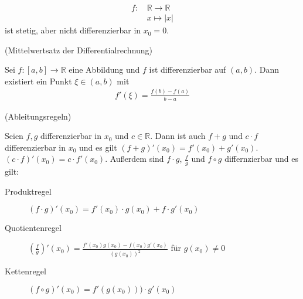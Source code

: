 \begin{align*}
    f : &\,\mathbb{R} \rightarrow \mathbb{R} \\
    &\,x \mapsto |x|
\end{align*}
ist stetig, aber nicht differenzierbar in $x_0 = 0$.

\begin{center}
\end{center}

 (Mittelwertsatz der Differentialrechnung)

Sei $f : [a, b] \rightarrow \mathbb{R}$ eine Abbildung und $f$ ist differenzierbar auf $(a, b)$. Dann existiert ein Punkt $\xi \in (a, b)$ mit
\begin{align*}
    f'(\xi) = \frac{f(b)-f(a)}{b-a}
\end{align*}


 (Ableitungsregeln)

Seien $f, g$ differenzierbar in $x_0$ und $c \in \mathbb{R}$. Dann ist auch $f+g$ und $c\cdot f$ differenzierbar in $x_0$ und es gilt $(f+g)'(x_0)=f'(x_0)+g'(x_0)$. $(c\cdot f)'(x_0) = c\cdot f'(x_0)$. Außerdem sind $f\cdot g$, $\frac{f}{g}$ und $f \circ g$ differnzierbar und es gilt:
\begin{description}
    \item[Produktregel]{$(f\cdot g)'(x_0) = f'(x_0)\cdot g(x_0) + f\cdot g'(x_0)$}
    \item[Quotientenregel]{$\left(\frac{f}{g}\right)'(x_0) = \frac{f'(x_0)g(x_0) - f(x_0)g'(x_0)}{(g(x_0))^2}$ für $g(x_0) \neq 0$}
    \item[Kettenregel]{$(f\circ g)'(x_0) = f'(g(x_0)))\cdot g'(x_0)$}
\end{description}

